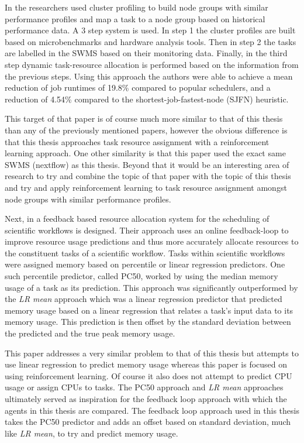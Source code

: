  In \cite{tarema} the researchers used cluster profiling to build node groups with similar performance profiles and map a task to a node group based on historical performance data. A 3 step system is used. In step 1 the cluster profiles are built based on microbenchmarks and hardware analysis tools. Then in step 2 the tasks are labelled in the SWMS based on their monitoring data. Finally, in the third step dynamic task-resource allocation is performed based on the information from the previous steps. Using this approach the authors were able to achieve a mean reduction of job runtimes of 19.8\% compared to popular schedulers, and a reduction of 4.54\% compared to the shortest-job-fastest-node (SJFN) heuristic. 

This target of that paper is of course much more similar to that of this thesis than any of the previously mentioned papers, however the obvious difference is that this thesis approaches task resource assignment with a reinforcement learning approach. One other similarity is that this paper used the exact same SWMS (nextflow) as this thesis. Beyond that it would be an interesting area of research to try and combine the topic of that paper with the topic of this thesis and try and apply reinforcement learning to task resource assignment amongst node groups with similar performance profiles.

Next, in \cite{FeedbackBasedAllocation} a feedback based resource allocation system for the scheduling of scientific workflows is designed. Their approach uses an online feedback-loop to improve resource usage predictions and thus more accurately allocate resources to the constituent tasks of a scientific workflow. Tasks within scientific workflows were assigned memory based on percentile or linear regression predictors. One such percentile predictor, called PC50, worked by using the median memory usage of a task as its prediction. This approach was significantly outperformed by the \textit{LR mean} approach which was a linear regression predictor that predicted memory usage based on a linear regression that relates a task’s input data to its memory usage. This prediction is then offset by the standard deviation between the predicted and the true peak memory usage.

This paper addresses a very similar problem to that of this thesis but attempts to use linear regression to predict memory usage whereas this paper is focused on using reinforcement learning. Of course it also does not attempt to predict CPU usage or assign CPUs to tasks. The PC50 approach and \textit{LR mean} approaches ultimately served as inspiration for the feedback loop approach with which the agents in this thesis are compared. The feedback loop approach used in this thesis takes the PC50 predictor and adds an offset based on standard deviation, much like \textit{LR mean}, to try and predict memory usage. 


